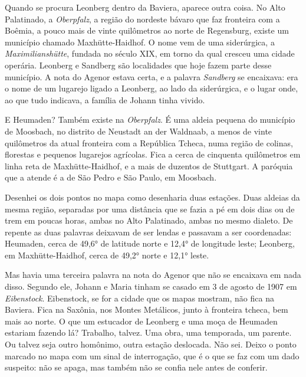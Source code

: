 \documentclass[
  brazilian,
  11pt,
  openany]{book}
\begin{document}
Quando se procura Leonberg dentro da Baviera, aparece outra coisa. No
Alto Palatinado, a \emph{Oberpfalz}, a região do nordeste bávaro que faz
fronteira com a Boêmia, a pouco mais de vinte quilômetros ao norte de
Regensburg, existe um município chamado Maxhütte-Haidhof. O nome vem de
uma siderúrgica, a \emph{Maximilianshütte}, fundada no século XIX, em
torno da qual cresceu uma cidade operária. Leonberg e Sandberg são
localidades que hoje fazem parte desse município. A nota do Agenor
estava certa, e a palavra \emph{Sandberg} se encaixava: era o nome de um
lugarejo ligado a Leonberg, ao lado da siderúrgica, e o lugar onde, ao
que tudo indicava, a família de Johann tinha vivido.

E Heumaden? Também existe na \emph{Oberpfalz}. É uma aldeia pequena do
município de Moosbach, no distrito de Neustadt an der Waldnaab, a menos
de vinte quilômetros da atual fronteira com a República Tcheca, numa
região de colinas, florestas e pequenos lugarejos agrícolas. Fica a
cerca de cinquenta quilômetros em linha reta de Maxhütte-Haidhof, e a
mais de duzentos de Stuttgart. A paróquia que a atende é a de São Pedro
e São Paulo, em Moosbach.

Desenhei os dois pontos no mapa como desenharia duas estações. Duas
aldeias da mesma região, separadas por uma distância que se fazia a pé
em dois dias ou de trem em poucas horas, ambas no Alto Palatinado, ambas
no mesmo dialeto. De repente as duas palavras deixavam de ser lendas e
passavam a ser coordenadas: Heumaden, cerca de 49,6° de latitude norte e
12,4° de longitude leste; Leonberg, em Maxhütte-Haidhof, cerca de 49,2°
norte e 12,1° leste.

Mas havia uma terceira palavra na nota do Agenor que não se encaixava em
nada disso. Segundo ele, Johann e Maria tinham se casado em 3 de agosto
de 1907 em \emph{Eibenstock}. Eibenstock, se for a cidade que os mapas
mostram, não fica na Baviera. Fica na Saxônia, nos Montes Metálicos,
junto à fronteira tcheca, bem mais ao norte. O que um estucador de
Leonberg e uma moça de Heumaden estariam fazendo lá? Trabalho, talvez.
Uma obra, uma temporada, um parente. Ou talvez seja outro homônimo,
outra estação deslocada. Não sei. Deixo o ponto marcado no mapa com um
sinal de interrogação, que é o que se faz com um dado suspeito: não se
apaga, mas também não se confia nele antes de conferir.
\end{document}
